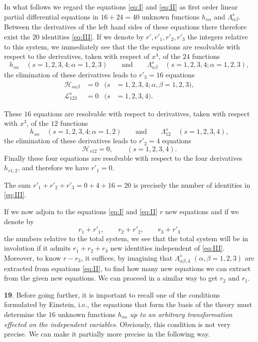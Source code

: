 \documentclass[leqno,11pt]{article}
\theoremstyle{shape1}
\theoremstyle{shape0}
\theoremstyle{shape2}
\theoremstyle{definition}
\begin{document}
In what follows we regard the equations \eqref{eq:I} and \eqref{eq:II} as first order linear partial differential equations  in $16+24=40$ unknown functions $h_{s\alpha}$ and $\Lambda^{s}_{\alpha\beta}$. Between the derivatives of the left hand sides of these equations there therefore exist the $20$ identities \eqref{eq:III}. If we denote by $r',r'_{1},r'_{2},r'_{3}$ the integers relative to this system, we immediately see that the the equations are resolvable with respect to the derivatives, taken with respect of $x^{4}$, of the $24$ functions
\[
h_{s\alpha}\quad(s=1,2,3,4;\alpha=1,2,3)\qquad\text{and}\qquad\Lambda^{s}_{\alpha\beta}\quad(s=1,2,3,4;\alpha=1,2,3),
\]
the elimination of these derivatives leads to $r'_{3}=16$ equations
\begin{align*}
  \mathcal{H}_{s\alpha\beta}&=0&(s&=1,2,3,4;\alpha,\beta=1,2,3),\\
  \mathcal{L}^{s}_{123}&=0&(s&=1,2,3,4).
\end{align*}

These $16$ equations are resolvable with respect to derivatives, taken with respect with $x^{3}$, of the $12$ functions
\[
h_{s\alpha}\quad(s=1,2,3,4;\alpha=1,2)\qquad\text{and}\qquad\Lambda^{s}_{12}\quad(s=1,2,3,4),
\]
the elimination of these derivatives leads to $r'_{2}=4$ equations
\[
\mathcal{H}_{s12}=0,\qquad(s=1,2,3,4).
\]
Finally these four equations are resolvable with respect to the four derivatives $h_{s1,2}$, and therefore we have $r'_{1}=0$.

The sum $r'_{1}+r'_{2}+r'_{3}=0+4+16=20$ is precisely the number of identities in \eqref{eq:III}.

If we now adjoin to the equations \eqref{eq:I} and \eqref{eq:II} $r$ new equations and if we denote by 
\[
r_{1}+r'_{1},\qquad r_{2}+r'_{2},\qquad r_{3}+r'_{3}
\]
the numbers relative to the total system, we see that the total system will be in involution if it admits $r_{1}+r_{2}+r_{3}$ new identities independent of \eqref{eq:III}. Moreover, to know $r-r_{3}$, it suffices, by imagining that $\Lambda^{s}_{\alpha\beta,4}$ $(\alpha,\beta=1,2,3)$ are extracted from equations \eqref{eq:II}, to find how many new equations we can extract from the given new equations. We can proceed in a similar way to get $r_{2}$ and $r_{1}$.

\vspace{12pt}

\textbf{19}. Before going further, it is important to recall one of the conditions formulated by Einstein, i.e., the equations that form the basis of the theory must determine the $16$ unknown functions $h_{s\alpha}$ \emph{up to an arbitrary transformation effected on the independent variables}. Obviously, this condition is not very precise. We can make it partially more precise in the following way.
\end{document}

